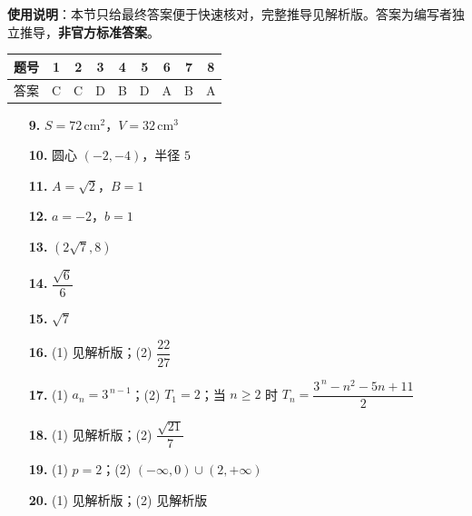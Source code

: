 
\begin{gknotice}
\textbf{使用说明}：本节只给最终答案便于快速核对，完整推导见解析版。答案为编写者独立推导，\textbf{非官方标准答案}。
\end{gknotice}

\begin{center}\begin{tabular}{ccccccccc}
\toprule
题号 & 1 & 2 & 3 & 4 & 5 & 6 & 7 & 8 \\
\midrule
答案 & C & C & D & B & D & A & B & A \\
\bottomrule
\end{tabular}\end{center}

\begin{itemize}[leftmargin=2.6em]
  \item[\textbf{9.}] \(S=72\,\mathrm{cm}^{2}\)，\(V=32\,\mathrm{cm}^{3}\)
  \item[\textbf{10.}] 圆心 \((-2,-4)\)，半径 \(5\)
  \item[\textbf{11.}] \(A=\sqrt{2}\)，\(B=1\)
  \item[\textbf{12.}] \(a=-2\)，\(b=1\)
  \item[\textbf{13.}] \((2\sqrt{7},8)\)
  \item[\textbf{14.}] \(\dfrac{\sqrt{6}}{6}\)
  \item[\textbf{15.}] \(\sqrt{7}\)
\end{itemize}

\begin{itemize}[leftmargin=2.6em]
  \item[\textbf{16.}] (1) 见解析版；(2) \(\dfrac{22}{27}\)
  \item[\textbf{17.}] (1) \(a_{n}=3^{\,n-1}\)；(2) \(T_{1}=2\)；当 \(n\geqslant 2\) 时 \(T_{n}=\dfrac{3^{\,n}-n^{2}-5n+11}{2}\)
  \item[\textbf{18.}] (1) 见解析版；(2) \(\dfrac{\sqrt{21}}{7}\)
  \item[\textbf{19.}] (1) \(p=2\)；(2) \((-\infty,0)\cup(2,+\infty)\)
  \item[\textbf{20.}] (1) 见解析版；(2) 见解析版
\end{itemize}
